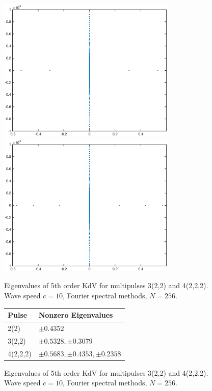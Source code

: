 \documentclass[12pt]{article}
\begin{document}
\begin{figure}[H]
	\includegraphics[width=8.5cm]{four10um1_3lambda}
	\includegraphics[width=8.5cm]{four10um1_4lambda}
	\caption{Eigenvalues of 5th order KdV for multipulses 3(2,2) and 4(2,2,2). Wave speed $c = 10$, Fourier spectral methods, $N = 256$. }
\end{figure}

\begin{figure}[H]
\begin{tabular}{l|l}
  Pulse    &  Nonzero Eigenvalues \\ \hline
  2(2)     &     $\pm 0.4352$  \\ 
  3(2,2)   &     $\pm 0.5328, \pm 0.3079$   \\ 
  4(2,2,2) &     $\pm 0.5683, \pm 0.4353, \pm 0.2358 $  \\ 
\end{tabular}
\caption{Eigenvalues of 5th order KdV for multipulses 3(2,2) and 4(2,2,2). Wave speed $c = 10$, Fourier spectral methods, $N = 256$. }
\end{figure}
\end{document}
